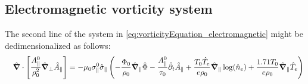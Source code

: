 \subsection{Electromagnetic vorticity system}
The second line of the system in \autoref{eq:vorticityEquation_electromagnetic} might be dedimensionalized as follows:
\begin{align}
	&&\hat{\grad}\cdot\left[\frac{A_\parallel^0}{\rho_0^2}\hat{\grad}_\perp \hat{A}_\parallel\right]
	&= -\mu_0\sigma_\parallel^0\hat{\sigma}_\parallel\left(
	- \frac{\Phi_0}{\rho_0}\hat{\grad}_\parallel\hat{\Phi}
	- \frac{A_\parallel^0}{\tau_0}\hat{\partial}_t\hat{A}_\parallel
	+ \frac{T_0\hat{T}_e}{e\rho_0}\hat{\grad}_\parallel\log(\hat{n}_e) 
	+ \frac{1.71T_0}{e\rho_0}\hat{\grad}_\parallel \hat{T}_e\right) \nonumber \\

\end{align}
